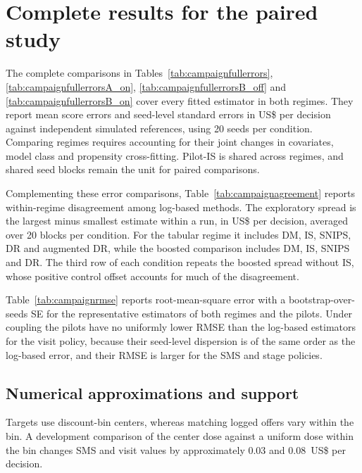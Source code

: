 \section{Complete results for the paired study}\label{sec:campaignextra}
The complete comparisons in Tables~\ref{tab:campaignfullerrors},
\ref{tab:campaignfullerrorsA_on}, \ref{tab:campaignfullerrorsB_off} and
\ref{tab:campaignfullerrorsB_on} cover every fitted estimator in both regimes.
They report mean score errors and seed-level standard errors in US\$
per decision against independent simulated references, using 20 seeds
per condition. Comparing regimes requires accounting for their joint
changes in covariates, model class and propensity cross-fitting.
Pilot-IS is shared across regimes, and shared seed blocks remain the
unit for paired comparisons.

Complementing these error comparisons, Table~\ref{tab:campaignagreement}
reports within-regime disagreement among log-based methods. The exploratory spread is the
largest minus smallest estimate within a run, in US\$ per decision,
averaged over 20 blocks per condition. For the tabular regime it includes
DM, IS, SNIPS, DR and augmented DR, while the boosted comparison includes
DM, IS, SNIPS and DR. The third row of each condition repeats the boosted
spread without IS, whose positive control offset accounts for much of the
disagreement.






Table~\ref{tab:campaignrmse} reports root-mean-square error with a
bootstrap-over-seeds SE for the representative estimators of both
regimes and the pilots. Under coupling the pilots have no uniformly lower
RMSE than the log-based estimators for the visit policy, because their
seed-level dispersion is of the same order as the log-based error, and
their RMSE is larger for the SMS and stage policies.


\FloatBarrier

\subsection{Numerical approximations and support}
Targets use discount-bin centers, whereas matching logged offers vary within the bin. A development comparison of the center dose against a uniform dose within the bin changes SMS and visit values by approximately 0.03 and 0.08~US\$ per decision.

